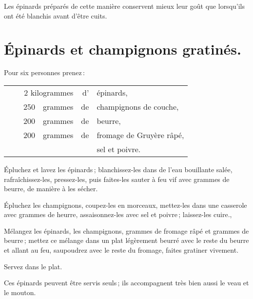 Les épinards préparés de cette manière conservent mieux leur goût que
lorsqu'ils ont été blanchis avant d'être cuits.

\section*{\centering Épinards et champignons gratinés.}
{}

Pour six personnes prenez :

\footnotesize
\begin{longtable}{rrrrrp{18em}}
  & \multicolumn{3}{r}{2 kilogrammes} & d' & épinards,                                                    \\
  &  \hspace{2em} & 250 & grammes & de & champignons de couche,                                           \\
  &  \hspace{2em} & 200 & grammes & de & beurre,                                                          \\
  &  \hspace{2em} & 200 & grammes & de & fromage de Gruyère râpé,                                         \\
  &  \hspace{2em} &     &         &    & sel et poivre.                                                   \\
\end{longtable}
\normalsize

Épluchez et lavez les épinards ; blanchissez-les dans de l’eau bouillante
salée, rafraîchissez-les, pressez-les, puis faites-les sauter à feu vif avec
{\mmm} grammes de beurre, de manière à les sécher.

Épluchez les champignons, coupez-les en morceaux, mettez-les dans une casserole
avec {\mmm} grammes de heurre, assaisonnez-les avec sel et poivre ;
laissez-les cuire.,

Mélangez les épinards, les champignons, {\mmm} grammes de fromage râpé
et {\mmm} grammes de beurre ; mettez ce mélange dans un plat légèrement
beurré avec le reste du beurre et allant au feu, saupoudrez avec le reste du
fromage, faites gratiner vivement.

Servez dans le plat.

\medskip

Ces épinards peuvent être servis seuls ; ils accompagnent très bien aussi le
veau et le mouton.

